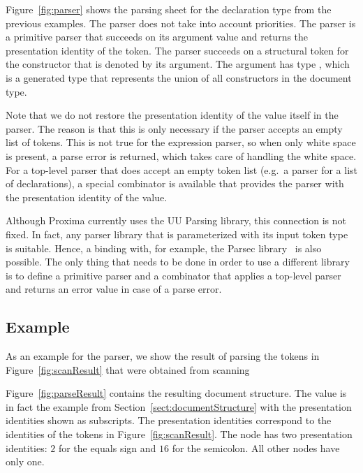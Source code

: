 \documentclass[12pt]{article}
\begin{document}
Figure~\ref{fig:parser} shows the parsing sheet for the declaration type from the previous examples. The parser does not take into account priorities.
The  parser is a primitive parser that succeeds on its argument  value and returns the presentation identity of the token. The  parser succeeds on a structural token for the constructor that is denoted by its argument. The argument has type , which is a generated type that represents the union of all constructors in the document type. 

Note that we do not restore the presentation identity of the  value itself in the  parser. The reason is that this is only necessary if the parser accepts an empty list of tokens. This is not true for the expression parser, so when only white space is present, a parse error is returned, which takes care of handling the white space. For a top-level parser that does accept an empty token list (e.g.\ a parser for a list of declarations), a special combinator is available that provides the parser with the presentation identity of the  value.

Although Proxima currently uses the UU Parsing library, this connection is not fixed. In fact, any  parser library that is parameterized with its input token type is suitable. Hence, a binding with, for example, the Parsec library~\cite{leijen08parsec} is also possible. The only thing that needs to be done in order to use a different library is to define a primitive parser  and a combinator that applies a top-level parser and returns an error value in case of a parse error.

\subsection{Example} \label{sect:parseExample}

As an example for the parser, we show the result of parsing the tokens in Figure~\ref{fig:scanResult} that were obtained from scanning ~ 

Figure~\ref{fig:parseResult} contains the resulting document structure. The value is in fact the example from Section~\ref{sect:documentStructure} with the presentation identities shown as subscripts. The presentation identities correspond to the identities of the tokens in Figure~\ref{fig:scanResult}. The  node has two presentation identities: $2$ for the equals sign and $16$ for the semicolon. All other nodes have only one. 
\end{document}
